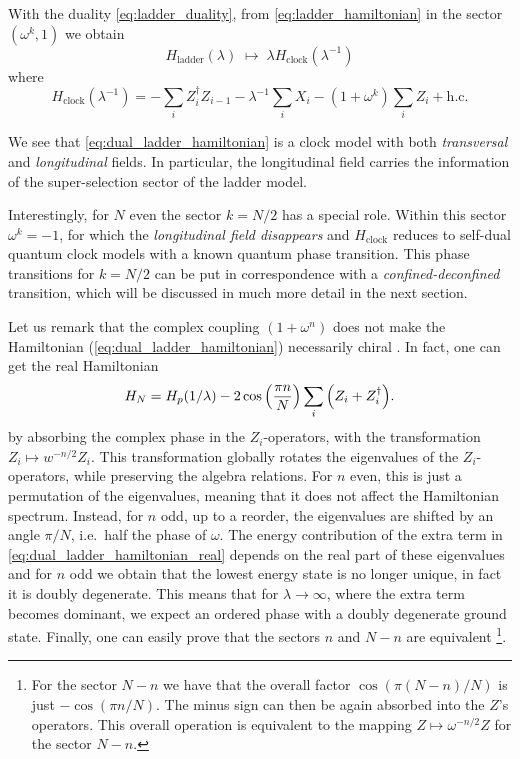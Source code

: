 With the duality \eqref{eq:ladder_duality}, from \eqref{eq:ladder_hamiltonian} in the sector $(\omega^k, 1)$ we obtain
\begin{equation}
    H_{\text{ladder}}(\lambda) \; \longmapsto \; \lambda H_{\text{clock}}(\lambda^{-1})
\end{equation}
where
\begin{equation}
    H_{\text{clock}}(\lambda^{-1}) =
    - \sum_{i} Z_i^\dagger Z_{i-1}
    - \lambda^{-1} \sum_{i} X_i
    - (1 + \omega^k) \sum_{i} Z_i
    + \text{h.c.}
    \label{eq:dual_ladder_hamiltonian}
\end{equation}

We see that \eqref{eq:dual_ladder_hamiltonian} is a clock model with both \emph{transversal} and \emph{longitudinal} fields.
In particular, the longitudinal field carries the information of the super-selection sector of the ladder model.

Interestingly, for $N$ even the sector $k = N/2$ has a special role.
Within this sector $\omega^k = -1$, for which the \emph{longitudinal field disappears} and $H_{\text{clock}}$ reduces to self-dual quantum clock models with a known quantum phase transition.
This phase transitions for $k = N/2$ can be put in correspondence with a \emph{confined-deconfined} transition, which will be discussed in much more detail in the next section.

Let us remark that the complex coupling $(1 + \omega^n)$ does not make the Hamiltonian  (\ref{eq:dual_ladder_hamiltonian}) necessarily chiral \cite{fendley2012parafermions, whitsitt2018clock}.
In fact, one can get the real Hamiltonian
\begin{equation}
    H_N = H_p(1/\lambda) - 2 \cos \pqty{\frac{\pi n}{N}} \sum_{i} \pqty{Z_i + Z_i^{\dagger}}.
    \label{eq:dual_ladder_hamiltonian_real}
\end{equation}
by absorbing the complex phase in the $Z_i$-operators, with the transformation $Z_i \mapsto w^{-n/2} Z_i$. This transformation globally rotates the eigenvalues of the $Z_i$-operators, while preserving the algebra relations.
For $n$ even, this is just a permutation of the eigenvalues, meaning that it does not affect the Hamiltonian spectrum. Instead, for $n$ odd, up to a reorder, the eigenvalues are shifted by an angle $\pi/N$, i.e.~half the phase of $\omega$.
The energy contribution of the extra term in \eqref{eq:dual_ladder_hamiltonian_real}  depends on the real part of these eigenvalues and for $n$ odd we obtain that the lowest energy state is no longer unique, in fact it is doubly degenerate.
This means that for $\lambda \to \infty$, where the extra term becomes dominant, we expect an ordered phase with a doubly degenerate ground state.
Finally, one can easily prove that the sectors $n$ and $N-n$ are equivalent
\footnote{For the sector $N-n$ we have that the overall factor $\cos(\pi(N-n)/N)$ is just $-\cos(\pi n/N)$.
The minus sign can then be again absorbed into the $Z$'s operators.
This overall operation is equivalent to the mapping $Z \mapsto \omega^{-n/2} Z$ for the sector $N-n$.}.
